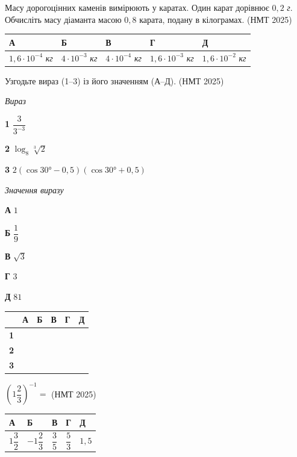 \documentclass[14pt]{extarticle}
\newcommand{\answerTable}[5]{
\begin{center}
\begin{tabular}{|*{5}{>{\centering\arraybackslash}m{2.8cm}|}}
\hline
\rule[-0.3cm]{0pt}{0.8cm}\textbf{А} & \textbf{Б} & \textbf{В} & \textbf{Г} & \textbf{Д} \\
\hline
\rule[-0.4cm]{0pt}{1.0cm}#1 & \rule[-0.4cm]{0pt}{1.0cm}#2 & \rule[-0.4cm]{0pt}{1.0cm}#3 & \rule[-0.4cm]{0pt}{1.0cm}#4 & \rule[-0.4cm]{0pt}{1.0cm}#5 \\
\hline
\end{tabular}
\end{center}
}
\newcommand{\answerTableBig}[5]{
\begin{center}
\begin{tabular}{|*{5}{>{\centering\arraybackslash}m{2.8cm}|}}
\hline
\rule[-0.3cm]{0pt}{0.8cm}\textbf{А} & \textbf{Б} & \textbf{В} & \textbf{Г} & \textbf{Д} \\
\hline
\rule[-0.6cm]{0pt}{1.4cm}#1 & \rule[-0.6cm]{0pt}{1.4cm}#2 & \rule[-0.6cm]{0pt}{1.4cm}#3 & \rule[-0.6cm]{0pt}{1.4cm}#4 & \rule[-0.6cm]{0pt}{1.4cm}#5 \\
\hline
\end{tabular}
\end{center}
}
\newcommand{\matchTable}{
\begin{tabular}{|>{\centering\arraybackslash}p{0.2cm}|*{5}{>{\centering\arraybackslash}p{0.2cm}|}}
\hline
& \textbf{А} & \textbf{Б} & \textbf{В} & \textbf{Г} & \textbf{Д} \\
\hline
\textbf{1} & \rule{0pt}{0.2cm} & & & & \\
\hline
\textbf{2} & \rule{0pt}{0.2cm} & & & & \\
\hline
\textbf{3} & \rule{0pt}{0.2cm} & & & & \\
\hline
\end{tabular}
}
\newcommand{\task}[2]{\noindent\makebox[1.5em][l]{\textbf{#1.}}\parbox[t]{\dimexpr\textwidth-1.5em}{#2}}
\newcommand{\nmtyear}[1]{\hfill{\small\color{yearcolor}(НМТ #1)}}
\begin{document}
\vspace{0.7cm}

\task{40}{Масу дорогоцінних каменів вимірюють у каратах. Один карат дорівнює $0{,}2$ \textit{г}. Обчисліть масу діаманта масою $0{,}8$ карата, подану в кілограмах. \nmtyear{2025}}
\answerTable{$1{,}6 \cdot 10^{-4}$ \textit{кг}}{$4 \cdot 10^{-3}$ \textit{кг}}{$4 \cdot 10^{-4}$ \textit{кг}}{$1{,}6 \cdot 10^{-3}$ \textit{кг}}{$1{,}6 \cdot 10^{-2}$ \textit{кг}}

\vspace{0.5cm}

\task{41}{Узгодьте вираз (1--3) із його значенням (А--Д). \nmtyear{2025}}

\vspace{0.3cm}
\begin{minipage}{0.45\textwidth}
\textit{Вираз}

\vspace{0.2cm}
\textbf{1} \quad $\dfrac{3}{3^{-3}}$

\vspace{0.3cm}
\textbf{2} \quad $\log_8 \sqrt[3]{2}$

\vspace{0.3cm}
\textbf{3} \quad $2(\cos 30° - 0{,}5)(\cos 30° + 0{,}5)$
\end{minipage}
\hfill
\begin{minipage}{0.3\textwidth}
\textit{Значення виразу}

\vspace{0.2cm}
\textbf{А} \quad $1$

\vspace{0.2cm}
\textbf{Б} \quad $\dfrac{1}{9}$

\vspace{0.2cm}
\textbf{В} \quad $\sqrt{3}$

\vspace{0.2cm}
\textbf{Г} \quad $3$

\vspace{0.2cm}
\textbf{Д} \quad $81$
\end{minipage}
\hfill
\begin{minipage}{0.15\textwidth}
\matchTable
\end{minipage}

\vspace{0.7cm}

\task{42}{$\left(1\dfrac{2}{3}\right)^{-1} =$ \nmtyear{2025}}
\answerTableBig{$1\dfrac{3}{2}$}{$-1\dfrac{2}{3}$}{$\dfrac{3}{5}$}{$\dfrac{5}{3}$}{$1{,}5$}
\end{document}
